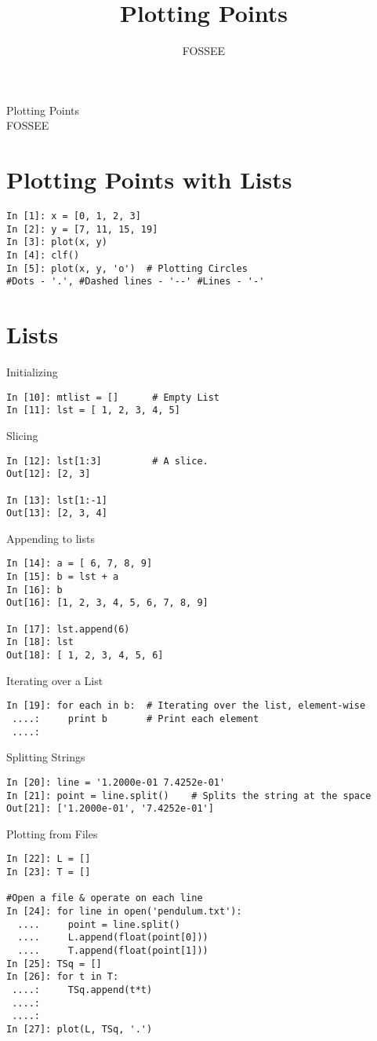 \documentclass[12pt]{article}
\title{Plotting Points}
\author{FOSSEE}
\begin{document}
\date{}
\vspace{-1in}
\begin{center}
\LARGE{Plotting Points}\\
\large{FOSSEE}
\end{center}

\section{Plotting Points with Lists}

\begin{lstlisting}
In [1]: x = [0, 1, 2, 3]
In [2]: y = [7, 11, 15, 19]
In [3]: plot(x, y)
In [4]: clf()
In [5]: plot(x, y, 'o')  # Plotting Circles
#Dots - '.', #Dashed lines - '--' #Lines - '-'
\end{lstlisting}

\section{Lists}

Initializing
  \begin{lstlisting}
In [10]: mtlist = []      # Empty List
In [11]: lst = [ 1, 2, 3, 4, 5] 
  \end{lstlisting}
Slicing
\begin{lstlisting}
In [12]: lst[1:3]         # A slice.
Out[12]: [2, 3]

In [13]: lst[1:-1]
Out[13]: [2, 3, 4]
\end{lstlisting}
Appending to lists
\begin{lstlisting}
In [14]: a = [ 6, 7, 8, 9]
In [15]: b = lst + a
In [16]: b
Out[16]: [1, 2, 3, 4, 5, 6, 7, 8, 9]

In [17]: lst.append(6)
In [18]: lst
Out[18]: [ 1, 2, 3, 4, 5, 6]
\end{lstlisting}

Iterating over a List
\begin{lstlisting}
In [19]: for each in b:  # Iterating over the list, element-wise
 ....:     print b       # Print each element
 ....:
\end{lstlisting}

Splitting Strings
\begin{lstlisting}
In [20]: line = '1.2000e-01 7.4252e-01'
In [21]: point = line.split()    # Splits the string at the space
Out[21]: ['1.2000e-01', '7.4252e-01']
\end{lstlisting}

Plotting from Files
\begin{lstlisting}
In [22]: L = []
In [23]: T = []

#Open a file & operate on each line
In [24]: for line in open('pendulum.txt'):  
  ....     point = line.split()
  ....     L.append(float(point[0]))
  ....     T.append(float(point[1]))
In [25]: TSq = []
In [26]: for t in T:
 ....:     TSq.append(t*t)
 ....:     
 ....:     
In [27]: plot(L, TSq, '.')
\end{lstlisting}
\end{document}
